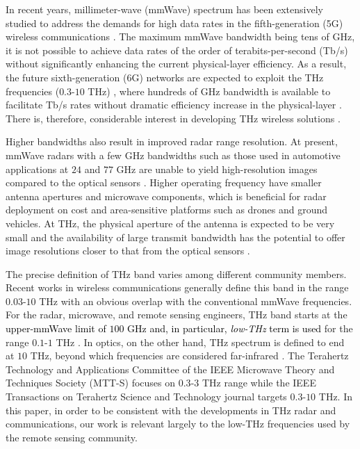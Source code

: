 \documentclass[journal,10pt]{IEEEtran}
\begin{document}
	In recent years, millimeter-wave (mmWave) spectrum has been extensively  studied to address the demands for high data rates in the fifth-generation (5G) wireless communications \cite{heath2016overview,mishra2019toward}. The maximum mmWave bandwidth being tens of GHz, it is not possible to achieve data rates of the order of terabits-per-second (Tb/s) without significantly enhancing the current physical-layer efficiency. As a result, the future sixth-generation (6G) networks are expected to exploit the THz frequencies ($0.3$-$10$ THz) \cite{rajatheva2020white,song2011present}, where hundreds of GHz bandwidth is available to facilitate Tb/s rates without dramatic efficiency increase in the physical-layer \cite{akyildiz2016realizing}. There is, therefore, considerable interest in developing THz wireless solutions \cite{kurner2014towards,tekbiyik2019terahertz}.
	
	Higher bandwidths also result in improved radar range resolution. At present, mmWave radars with a few GHz bandwidths such as those used in automotive applications \cite{dokhanchi2019mmwave} at $24$ and $77$ GHz are unable to yield high-resolution images compared to the optical sensors \cite{wang2020displaced}. Higher operating frequency have smaller antenna apertures and microwave components, which is beneficial for radar deployment on cost and area-sensitive platforms such as drones and ground vehicles. At THz, the physical aperture of the antenna is expected to be very small and the availability of large transmit bandwidth has the potential to offer image resolutions closer to that from the optical sensors \cite{marchetti2018radar}.
	
	The precise definition of THz band varies among different community members. Recent works in wireless communications generally define this band in the range $0.03$-$10$ THz \cite{faisal2020ultramassive} with an obvious overlap with the conventional mmWave frequencies. For the radar, microwave, and remote sensing engineers, THz band starts at the \textcolor{black}{upper-mmWave limit of $100$ GHz and, in particular, \textit{low-THz} term is used} for the range $0.1$-$1$ THz \cite{norouzian2017low}. In optics, on the other hand, THz spectrum is defined to end at $10$ THz, beyond which frequencies are considered far-infrared \cite{schmuttenmaer2004exploring}. The Terahertz Technology and Applications Committee of the IEEE Microwave Theory and Techniques Society (MTT-S) focuses on $0.3$-$3$ THz range while the IEEE Transactions on Terahertz Science and Technology journal targets $0.3$-$10$ THz. In this paper, in order to be consistent with the developments in THz radar and communications, our work is relevant largely to the low-THz frequencies used by the remote sensing community.
	
\end{document}
